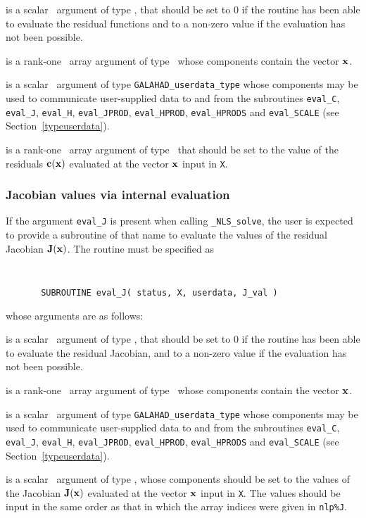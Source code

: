 \documentclass{galahad}
\newcommand{\packagename}{NLS}
\newcommand{\fullpackagename}{\libraryname\_\packagename}
\newcommand{\solver}{{\tt \fullpackagename\_solve}}
\begin{document}
\begin{description}
 is a scalar \intentout\ argument of type \integer,
that should be set to 0 if the routine has been able to evaluate
the residual functions
and to a non-zero value if the evaluation has not been possible.

 is a rank-one \intentin\ array argument of type \realdp\
whose components contain the vector ${\mathbf{x}}$.

 is a scalar \intentinout\ argument of type
{\tt GALAHAD\_userdata\_type} whose components may be used
to communicate user-supplied data to and from the subroutines
{\tt eval\_C}, {\tt eval\_J}, {\tt eval\_H}, {\tt eval\_JPROD},
{\tt eval\_HPROD}, {\tt eval\_HPRODS} and {\tt eval\_SCALE}
(see Section~\ref{typeuserdata}).

 is a rank-one \intentout\ array argument of type \realdp\
that should be set to the value of the residuals ${\mathbf{c}}({\mathbf{x}})$
evaluated at the vector ${\mathbf{x}}$ input in {\tt X}.

\end{description}


\subsubsection{Jacobian values via internal evaluation\label{jfv}}

If the argument {\tt eval\_J} is present when calling \solver, the
user is expected to provide a subroutine of that name to evaluate the
values of the residual Jacobian ${\mathbf{J}}({\mathbf{x}})$.
The routine must be specified as

\def\baselinestretch{0.8}
{\tt
\begin{verbatim}
       SUBROUTINE eval_J( status, X, userdata, J_val )
\end{verbatim} }
\def\baselinestretch{1.0}
\noindent whose arguments are as follows:

\begin{description}
 is a scalar \intentout\ argument of type \integer,
that should be set to 0 if the routine has been able to evaluate
the residual Jacobian,
and to a non-zero value if the evaluation has not been possible.

\ittf{X} is a rank-one \intentin\ array argument of type \realdp\
whose components contain the vector ${\mathbf{x}}$.

\itt{userdata} is a scalar \intentinout\ argument of type
{\tt GALAHAD\_userdata\_type} whose components may be used
to communicate user-supplied data to and from the subroutines
{\tt eval\_C}, {\tt eval\_J}, {\tt eval\_H}, {\tt eval\_JPROD},
{\tt eval\_HPROD}, {\tt eval\_HPRODS} and {\tt eval\_SCALE}
(see Section~\ref{typeuserdata}).

\itt{J\_val} is a scalar \intentout\ argument of type \realdp,
whose components should be set to the values
of the Jacobian ${\mathbf{J}}({\mathbf{x}})$
evaluated at the vector ${\mathbf{x}}$ input in {\tt X}.
The values should
be input in the same order as that in which the array indices were
given in {\tt nlp\%J}.

\end{description}
\end{document}
